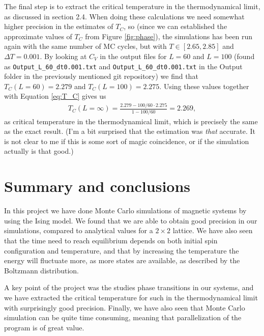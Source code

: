 \documentclass[12pt, a4paper]{article}
\begin{document}
The final step is to extract the critical temperature in the thermodynamical limit, as discussed in 
section 2.4. When doing these calculations we need somewhat higher precision in the estimates of 
$T_C$, so (since we can established the approximate values of $T_C$ from Figure \ref{fig:phase}), 
the simulations has been run again with the same number of MC cycles, but with $T\in [2.65,2.85]$ and 
$\Delta T = 0.001$. By looking at $C_V$ in the output files for $L=60$ and $L=100$
(found as \texttt{Output\_L\_60\_dt0.001.txt} and \texttt{Output\_L\_60\_dt0.001.txt} in the 
Output folder in the previously mentioned git repository) we find that $T_C(L=60)=2.279$ and 
$T_C(L=100)=2.275$. Using these values together with Equation \ref{eq:T_C} gives us 
\begin{align*}
T_C(L=\infty) = \frac{2.279 - 100/60\cdot 2.275}{1- 100/60} = 2.269, 
\end{align*}
as critical temperature in the thermodynamical limit, 
which is precisely the same as the exact result. (I'm a bit surprised that the estimation was \textit{that}
accurate. It is not clear to me if this is some sort of magic coincidence, or if the simulation actually 
is that good.) 

\section{Summary and conclusions}

In this project we have done Monte Carlo simulations of magnetic systems by using the Ising model. We 
found that we are able to obtain good precision in our simulations, compared to analytical values 
for a $2\times 2$ lattice. We have also seen that the time need to reach equilibrium depends on both 
initial spin configuration and temperature, and that by increasing the temperature the energy will 
fluctuate more, as more states are available, as described by the Boltzmann distribution. 

A key point of the project was the studies phase transitions in our systems, and we have extracted 
the critical temperature for such in the thermodynamical limit with surprisingly good precision. 
Finally, we have also seen that Monte Carlo simulation can be quite time consuming, meaning that
parallelization of the program is of great value. 
\end{document}

